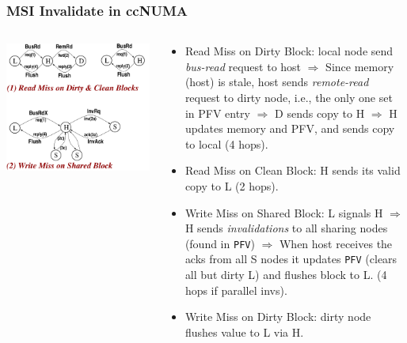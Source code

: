 \documentclass{beamer}
\newcommand{\emp}[1]{\textcolor{DikuRed}{ #1}}
\begin{document}
\begin{frame}[fragile,t]
\frametitle{MSI Invalidate in ccNUMA}

\begin{columns}
\includegraphics[width=45ex]{FigsInfCoherence/MSIccNUMA}\pause
{}
\begin{scriptsize}
\begin{itemize}
    \item \emp{Read Miss on Dirty Block:} local node send {\em bus-read} request to host 
                $\Rightarrow$ Since memory (host) is stale,
                   host sends {\em remote-read} request to dirty node, i.e., the only one 
                    set in PFV entry $\Rightarrow$ D sends copy to H $\Rightarrow$ H updates
                    memory and PFV, and sends copy to local (4 hops). 

    \item \emp{Read Miss on Clean Block:} H sends its valid copy to L (2 hops).\smallskip

    \item \emp{Write Miss on Shared Block:} L signals H
            $\Rightarrow$ H sends {\em invalidations} to all sharing nodes
            (found in {\tt PFV}) $\Rightarrow$ When host receives the acks from all 
            S nodes it updates {\tt PFV} (clears all but dirty L) and flushes block to L.
            (4 hops if parallel invs).
    \item \emp{Write Miss on Dirty Block:} dirty node flushes value to L via H.
\end  {itemize}
\end{scriptsize}
\end{columns}
\end{frame}
\end{document}
